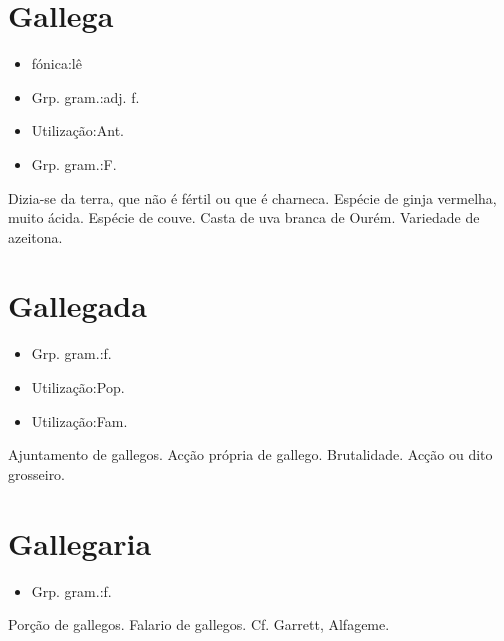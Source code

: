 \section{Gallega}
\begin{itemize}
\item {fónica:lê}
\end{itemize}
\begin{itemize}
\item {Grp. gram.:adj. f.}
\end{itemize}
\begin{itemize}
\item {Utilização:Ant.}
\end{itemize}
\begin{itemize}
\item {Grp. gram.:F.}
\end{itemize}
Dizia-se da terra, que não é fértil ou que é charneca.
Espécie de ginja vermelha, muito ácida.
Espécie de couve.
Casta de uva branca de Ourém.
Variedade de azeitona.
\section{Gallegada}
\begin{itemize}
\item {Grp. gram.:f.}
\end{itemize}
\begin{itemize}
\item {Utilização:Pop.}
\end{itemize}
\begin{itemize}
\item {Utilização:Fam.}
\end{itemize}
Ajuntamento de gallegos.
Acção própria de gallego.
Brutalidade.
Acção ou dito grosseiro.
\section{Gallegaria}
\begin{itemize}
\item {Grp. gram.:f.}
\end{itemize}
Porção de gallegos.
Falario de gallegos. Cf. Garrett, \textunderscore Alfageme\textunderscore .
